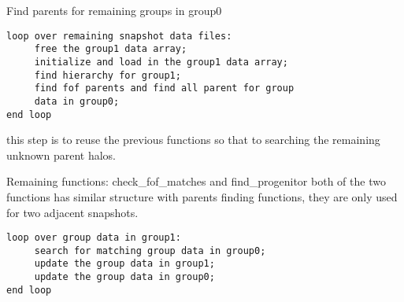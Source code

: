 \documentclass[notheorems, aspectratio=54]{beamer}
\begin{document}
\begin{frame}[fragile]

\begin{block}{Find parents for remaining groups in group0}
 \begin{verbatim}
loop over remaining snapshot data files:
     free the group1 data array;
     initialize and load in the group1 data array;
     find hierarchy for group1;
     find fof parents and find all parent for group 
     data in group0;
end loop
 \end{verbatim}
\end{block}
this step is to reuse the previous functions so that to searching the remaining unknown parent halos.

\end{frame}

\begin{frame}[fragile]

\begin{block}{Remaining functions: check\_fof\_matches and find\_progenitor}
both of the two functions has similar structure with parents finding functions, they are only used
for two adjacent snapshots.
 \begin{verbatim}
loop over group data in group1:
     search for matching group data in group0;
     update the group data in group1;
     update the group data in group0;
end loop
 \end{verbatim}
\end{block}

\end{frame}

\end{document}
